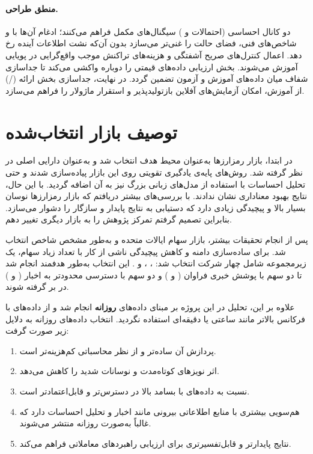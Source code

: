 \documentclass[12pt, a4paper]{report}
\begin{document}
\paragraph{منطق طراحی.}
دو کانال احساسی (احتمالات  و ) سیگنال‌های مکمل فراهم می‌کنند؛ 
ادغام آن‌ها با  و شاخص‌های فنی، فضای حالت را غنی‌تر می‌سازد بدون آن‌که نشت اطلاعات آینده رخ دهد. 
اعمال کنترل‌های صریح آشفتگی و هزینه‌های تراکنش موجب واقع‌گرایی در پویایی آموزش می‌شوند. 
بخش ارزیابی داده‌های قیمتی را دوباره واکشی می‌کند تا جداسازی شفاف میان داده‌های آموزش و آزمون تضمین گردد. 
در نهایت، جداسازی بخش ارائه (/) از آموزش، امکان آزمایش‌های آفلاین بازتولیدپذیر و استقرار ماژولار را فراهم می‌سازد.


\section{توصیف بازار انتخاب‌شده}

در ابتدا، بازار رمزارزها به‌عنوان محیط هدف انتخاب شد و  به‌عنوان دارایی اصلی در نظر گرفته شد. 
روش‌های پایه‌ی یادگیری تقویتی روی این بازار پیاده‌سازی شدند و حتی تحلیل احساسات با استفاده از مدل‌های زبانی بزرگ نیز به آن اضافه گردید. 
با این حال، نتایج بهبود معناداری نشان ندادند. 
با بررسی‌های بیشتر دریافتم که بازار رمزارزها نوسان بسیار بالا و پیچیدگی زیادی دارد که دستیابی به نتایج پایدار و سازگار را دشوار می‌سازد. 
بنابراین تصمیم گرفتم تمرکز پژوهش را به بازار دیگری تغییر دهم.  

پس از انجام تحقیقات بیشتر، بازار سهام ایالات متحده و به‌طور مشخص شاخص  انتخاب شد. 
برای ساده‌سازی دامنه و کاهش پیچیدگی ناشی از کار با تعداد زیاد سهام، یک زیرمجموعه شامل چهار شرکت انتخاب شد: 
، ،  و .  
این انتخاب به‌طور هدفمند انجام شد تا دو سهم با پوشش خبری فراوان ( و ) و دو سهم با دسترسی محدودتر به اخبار ( و ) در بر گرفته شوند.  

علاوه بر این، تحلیل در این پروژه بر مبنای داده‌های \textbf{روزانه} انجام شد و از داده‌های با فرکانس بالاتر مانند ساعتی یا دقیقه‌ای استفاده نگردید. 
انتخاب داده‌های روزانه به دلایل زیر صورت گرفت:

\begin{enumerate}
    \item پردازش آن ساده‌تر و از نظر محاسباتی کم‌هزینه‌تر است.  
    \item اثر نویزهای کوتاه‌مدت و نوسانات شدید را کاهش می‌دهد.  
    \item نسبت به داده‌های با بسامد بالا در دسترس‌تر و قابل‌اعتمادتر است.  
    \item هم‌سویی بیشتری با منابع اطلاعاتی بیرونی مانند اخبار و تحلیل احساسات دارد که غالباً به‌صورت روزانه منتشر می‌شوند.  
    \item نتایج پایدارتر و قابل‌تفسیرتری برای ارزیابی راهبردهای معاملاتی فراهم می‌کند.  
\end{enumerate}
\end{document}
